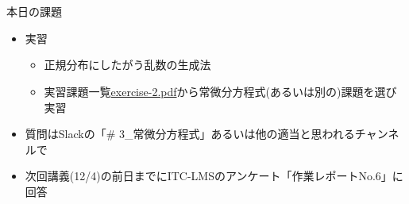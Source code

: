 \documentclass[10pt,dvipdfmx]{beamer}
\begin{document}
\section{}
\begin{frame}[t]{本日の課題}
  \begin{itemize}
  \item 実習
    \begin{itemize}
    \item 正規分布にしたがう乱数の生成法
    \item 実習課題一覧\href{https://github.com/todo-group/ComputerExperiments/releases/tag/2020a-computer2}{exercise-2.pdf}から常微分方程式(あるいは別の)課題を選び実習
    \end{itemize}
  \item 質問はSlackの「\# 3\_常微分方程式」あるいは他の適当と思われるチャンネルで
  \item 次回講義(12/4)の前日までにITC-LMSのアンケート「作業レポートNo.6」に回答
  \end{itemize}
\end{frame}
\end{document}
